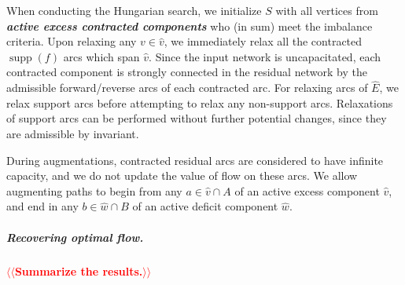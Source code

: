 \documentclass[a4paper,UKenglish]{socg-lipics-v2018}
\makeatletter
\def\note#1{\textcolor{red}{{#1}}}
\def\supp{\operatorname{supp}}
\theoremstyle{plain}
\numberwithin{figure}{section}
\renewcommand{\paragraph}{\subparagraph}
\def\EMPH#1{\textbf{\emph{\boldmath #1}}}
\def\n@te#1{\textsf{\boldmath \textbf{$\langle\!\langle$#1$\rangle\!\rangle$}}\leavevmode}
\def\note#1{\textcolor{red}{\n@te{#1}}}
\makeatother
\begin{document}
When conducting the Hungarian search, we initialize $S$ with all vertices from
\EMPH{active excess contracted components} who (in sum) meet the imbalance
criteria.
Upon relaxing any $v \in \hat{v}$, we immediately relax all the contracted
$\supp(f)$ arcs which span $\hat{v}$.
Since the input network is uncapacitated, each contracted component is
strongly connected in the residual network by the admissible forward/reverse
arcs of each contracted arc.
For relaxing arcs of $\hat{E}$, we relax support arcs before attempting to
relax any non-support arcs.
Relaxations of support arcs can be performed without further potential changes,
since they are admissible by invariant.

During augmentations, contracted residual arcs are considered to have infinite
capacity, and we do not update the value of flow on these arcs.
We allow augmenting paths to begin from any $a \in \hat{v} \cap A$ of an active
excess component $\hat{v}$, and end in any $b \in \hat{w} \cap B$ of an active
deficit component $\hat{w}$.

\paragraph{Recovering optimal flow.}
\note{Summarize the results.}
\end{document}
